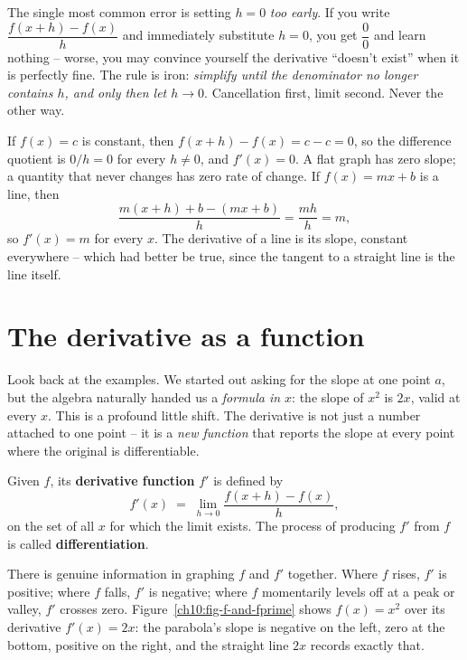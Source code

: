 \begin{trapbox}
The single most common error is setting $h = 0$ \emph{too early}. If you write
$\dfrac{f(x+h)-f(x)}{h}$ and immediately substitute $h = 0$, you get
$\dfrac{0}{0}$ and learn nothing -- worse, you may convince yourself the
derivative ``doesn't exist'' when it is perfectly fine. The rule is iron:
\emph{simplify until the denominator no longer contains $h$, and only then let
$h \to 0$}. Cancellation first, limit second. Never the other way.
\end{trapbox}

\begin{example}
\label{ch10:ex-const-line}
If $f(x) = c$ is constant, then $f(x+h) - f(x) = c - c = 0$, so the difference
quotient is $0/h = 0$ for every $h \neq 0$, and $f'(x) = 0$. A flat graph has zero
slope; a quantity that never changes has zero rate of change. If $f(x) = mx + b$
is a line, then
\[
  \frac{m(x+h)+b - (mx+b)}{h} = \frac{mh}{h} = m,
\]
so $f'(x) = m$ for every $x$. The derivative of a line is its slope, constant
everywhere -- which had better be true, since the tangent to a straight line is
the line itself.
\end{example}

\section{The derivative as a function}
\label{ch10:deriv-as-function}

Look back at the examples. We started out asking for the slope at one point $a$,
but the algebra naturally handed us a \emph{formula in $x$}: the slope of $x^2$ is
$2x$, valid at every $x$. This is a profound little shift. The derivative is not
just a number attached to one point -- it is a \emph{new function} that reports
the slope at every point where the original is differentiable.

\begin{definition}
\label{ch10:def-deriv-function}
Given $f$, its \textbf{derivative function} $f'$ is defined by
\[
  f'(x) \;=\; \lim_{h \to 0} \frac{f(x + h) - f(x)}{h},
\]
on the set of all $x$ for which the limit exists. The process of producing $f'$
from $f$ is called \textbf{differentiation}.
\end{definition}

There is genuine information in graphing $f$ and $f'$ together. Where $f$ rises,
$f'$ is positive; where $f$ falls, $f'$ is negative; where $f$ momentarily levels
off at a peak or valley, $f'$ crosses zero. Figure~\ref{ch10:fig-f-and-fprime}
shows $f(x) = x^2$ over its derivative $f'(x) = 2x$: the parabola's slope is
negative on the left, zero at the bottom, positive on the right, and the straight
line $2x$ records exactly that.

